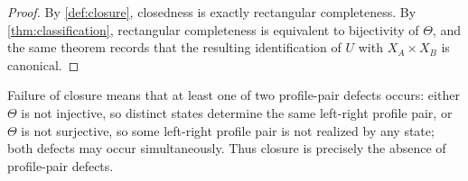 \begin{proof}
	By \cref{def:closure}, closedness is exactly rectangular completeness.
	By \cref{thm:classification}, rectangular completeness is equivalent to
	bijectivity of \(\Theta\), and the same theorem records that the
	resulting identification of \(U\) with \(X_A\times X_B\) is canonical.
\end{proof}
\begin{remark}
	Failure of closure means that at least one of two profile-pair
	defects occurs: either \(\Theta\) is not injective, so distinct
	states determine the same left-right profile pair, or \(\Theta\) is
	not surjective, so some left-right profile pair is not realized by
	any state; both defects may occur simultaneously. Thus closure is
	precisely the absence of profile-pair defects.
\end{remark}
